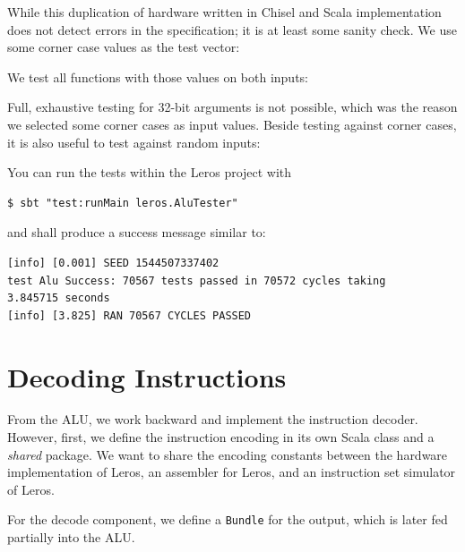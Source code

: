 \documentclass[%
    10pt,
    headinclude, footexclude,
    openright, %
    notitlepage,
    cleardoubleempty,
    headsepline,
    pointlessnumbers,
    bibtotoc, idxtotoc,
    ]{scrbook}
\newcommand{\code}[1]{{\small{\texttt{#1}}}}
\newcommand{\todo}[1]{{\emph{TODO: #1}}}
\renewcommand{\todo}[1]{}
\begin{document}

\noindent While this duplication of hardware written in Chisel and Scala implementation does not
detect errors in the specification; it is at least some sanity check.
We use some corner case values as the test vector:


\noindent We test all functions with those values on both inputs:


\noindent Full, exhaustive testing for 32-bit arguments is not possible, which was the reason we
selected some corner cases as input values. Beside testing against corner cases, it is also useful
to test against random inputs:


\noindent You can run the tests within the Leros project with

\begin{verbatim}
$ sbt "test:runMain leros.AluTester"
\end{verbatim}

and shall produce a success message similar to:

\begin{verbatim}
[info] [0.001] SEED 1544507337402
test Alu Success: 70567 tests passed in 70572 cycles taking
3.845715 seconds
[info] [3.825] RAN 70567 CYCLES PASSED
\end{verbatim}

\section{Decoding Instructions}


From the ALU, we work backward and implement the instruction decoder.
However, first, we define the instruction encoding in its own Scala class and
a \emph{shared} package. We want to share the encoding constants between
the hardware implementation of Leros, an assembler for Leros, and an instruction
set simulator of Leros.


\todo{Update code when Leros is more complete, as stuff is missing.}

\noindent For the decode component, we define a \code{Bundle} for the output,
which is later fed partially into the ALU.
\end{document}
